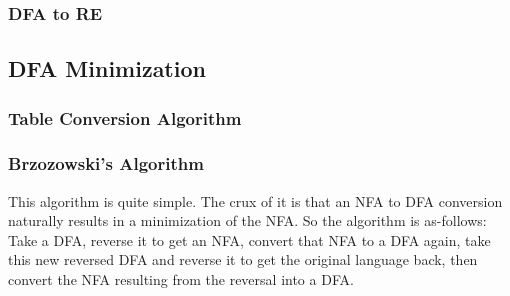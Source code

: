 \subsubsection{DFA to RE}

\subsection{DFA Minimization}

    \subsubsection{Table Conversion Algorithm}
    \subsubsection{Brzozowski's Algorithm}
    This algorithm is quite simple. The crux of it is that an NFA to DFA conversion
    naturally results in a minimization of the NFA. So the algorithm is as-follows:
    Take a DFA, reverse it to get an NFA, convert that NFA to a DFA again, take
    this new reversed DFA and reverse it to get the original language back, then
    convert the NFA resulting from the reversal into a DFA.
